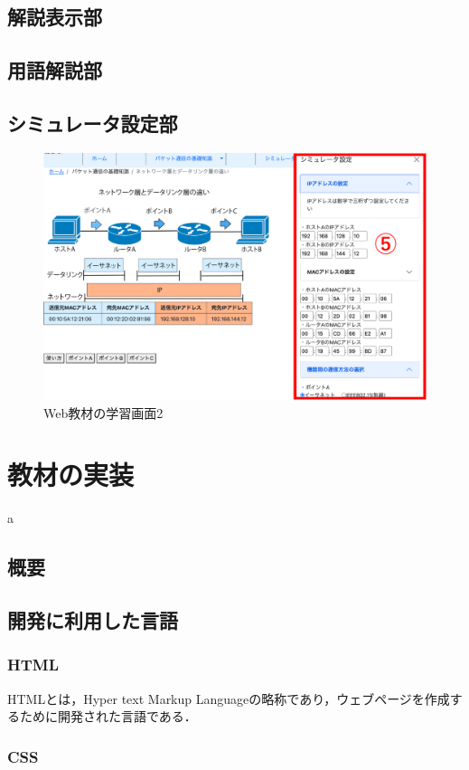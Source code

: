 \documentclass[12pt,a4j,titlepage]{ltjsarticle}
\begin{document}
\subsection{解説表示部}
\subsection{用語解説部}
\subsection{シミュレータ設定部}
\begin{figure}[h]
\begin{center}
 \includegraphics[clip,width=150mm]{figures/gamen2.pdf}
\end{center}
 \caption{Web教材の学習画面2}
 \label{fig:画面2}
\end{figure}
\clearpage

\section{教材の実装}%
a
\subsection{概要}
\subsection{開発に利用した言語}
\subsubsection{HTML}
HTMLとは，Hyper text Markup Languageの略称であり，ウェブページを作成するために開発された言語である．
\subsubsection{CSS}
\end{document}
